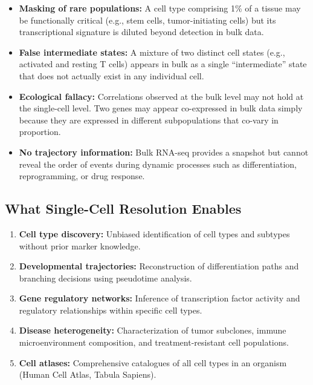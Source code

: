 \begin{itemize}[nosep]
  \item \textbf{Masking of rare populations:} A cell type comprising 1\% of a
    tissue may be functionally critical (e.g., stem cells, tumor-initiating
    cells) but its transcriptional signature is diluted beyond detection in
    bulk data.
  \item \textbf{False intermediate states:} A mixture of two distinct cell
    states (e.g., activated and resting T cells) appears in bulk as a single
    ``intermediate'' state that does not actually exist in any individual cell.
  \item \textbf{Ecological fallacy:} Correlations observed at the bulk level
    may not hold at the single-cell level. Two genes may appear co-expressed
    in bulk data simply because they are expressed in different subpopulations
    that co-vary in proportion.
  \item \textbf{No trajectory information:} Bulk RNA-seq provides a snapshot
    but cannot reveal the order of events during dynamic processes such as
    differentiation, reprogramming, or drug response.
\end{itemize}

\subsection{What Single-Cell Resolution Enables}

\begin{enumerate}[nosep]
  \item \textbf{Cell type discovery:} Unbiased identification of cell types
    and subtypes without prior marker knowledge.
  \item \textbf{Developmental trajectories:} Reconstruction of differentiation
    paths and branching decisions using pseudotime analysis.
  \item \textbf{Gene regulatory networks:} Inference of transcription factor
    activity and regulatory relationships within specific cell types.
  \item \textbf{Disease heterogeneity:} Characterization of tumor
    subclones, immune microenvironment composition, and treatment-resistant
    cell populations.
  \item \textbf{Cell atlases:} Comprehensive catalogues of all cell types in
    an organism (Human Cell Atlas, Tabula Sapiens).
\end{enumerate}


